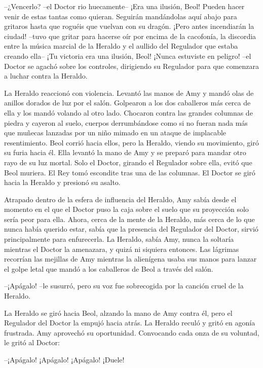 {--¿Vencerlo? --el Doctor rio huecamente-- ¡Era una ilusión, Beol!
	Pueden hacer venir de estas tantas como quieran. Seguirán mandándolas
	aquí abajo para gritaros hasta que roguéis que vuelvan con su dragón.
	¡Pero antes incendiarán la ciudad! --tuvo que gritar para hacerse oír
	por encima de la cacofonía, la discordia entre la música marcial de la
	Heraldo y el aullido del Regulador que estaba creando ella-- ¡Tu
	victoria era una ilusión, Beol! ¡Nunca estuviste en peligro! --el Doctor
	se agachó sobre los controles, dirigiendo su Regulador para que
comenzara a luchar contra la Heraldo.}

{La Heraldo reaccionó con violencia. Levantó las manos de Amy y mandó
	olas de anillos dorados de luz por el salón. Golpearon a los dos
	caballeros más cerca de ella y los mandó volando al otro lado. Chocaron
	contra las grandes columnas de piedra y cayeron al suelo, cuerpos
	derrumbándose como si no fueran nada más que muñecas lanzadas por un
	niño mimado en un ataque de implacable resentimiento. Beol corrió hacia
	ellos, pero la Heraldo, viendo su movimiento, giró su furia hacia él.
	Ella levantó la mano de Amy y se preparó para mandar otro rayo de su luz
	mortal. Solo el Doctor, girando el Regulador sobre ella, evitó que Beol
	muriera. El Rey tomó escondite tras una de las columnas. El Doctor se
giró hacia la Heraldo y presionó su asalto.}

\mbox{}

{Atrapado dentro de la esfera de influencia del Heraldo, Amy sabía desde
	el momento en el que el Doctor puso la caja sobre el suelo que su
	proyección solo sería peor para ella. Ahora, cerca de la mente de la
	Heraldo, más cerca de lo que nunca había querido estar, sabía que la
	presencia del Regulador del Doctor, sirvió principalmente para
	enfurecerla. La Heraldo, sabía Amy, nunca la soltaría mientras el Doctor
	la amenazara, y quizá ni siquiera entonces. Las lágrimas recorrían las
	mejillas de Amy mientras la alienígena usaba sus manos para lanzar el
golpe letal que mandó a los caballeros de Beol a través del salón.}

{--¡Apágalo! --le susurró, pero su voz fue sobrecogida por la canción
cruel de la Heraldo.}

{La Heraldo se giró hacia Beol, alzando la mano de Amy contra él, pero
	el Regulador del Doctor la empujó hacia atrás. La Heraldo reculó y gritó
	en agonía frustrada. Amy aprovechó su oportunidad. Convocando cada onza
de su voluntad, le gritó al Doctor:}

{--¡Apágalo! ¡Apágalo! ¡Apágalo! ¡Duele!}

